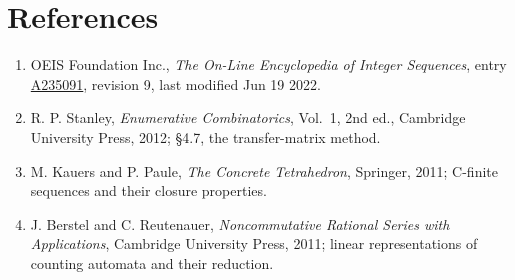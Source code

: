 \documentclass[11pt]{article}
\theoremstyle{definition}
\begin{document}
\section{References}

\begin{enumerate}

\item OEIS Foundation Inc., \emph{The On-Line Encyclopedia of Integer Sequences}, entry \href{https://oeis.org/A235091}{A235091}, revision 9, last modified Jun 19 2022.

\item R. P. Stanley, \emph{Enumerative Combinatorics}, Vol.~1, 2nd ed., Cambridge University Press, 2012; \S4.7, the transfer-matrix method.

\item M. Kauers and P. Paule, \emph{The Concrete Tetrahedron}, Springer, 2011; C-finite sequences and their closure properties.

\item J. Berstel and C. Reutenauer, \emph{Noncommutative Rational Series with Applications}, Cambridge University Press, 2011; linear representations of counting automata and their reduction.

\end{enumerate}
\end{document}
